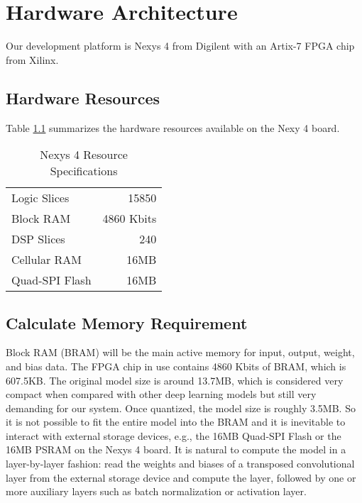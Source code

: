 
\chapter{Hardware Architecture}

Our development platform is Nexys 4 from Digilent with an Artix-7 FPGA chip from Xilinx.

\section{Hardware Resources}

Table \ref{table:hardware_resources} summarizes the hardware resources available on the Nexy 4 board.

\begin{table}[h]
  \centering
  \caption{Nexys 4 Resource Specifications}
  \begin{tabular}{lr}
    Logic Slices & 15850 \\
    Block RAM & 4860 Kbits \\
    DSP Slices & 240 \\
    Cellular RAM & 16MB \\
    Quad-SPI Flash & 16MB
  \end{tabular}
  \label{table:hardware_resources}
\end{table}

\section{Calculate Memory Requirement}

Block RAM (BRAM) will be the main active memory for input, output, weight, and bias data. The FPGA chip in use
contains 4860 Kbits of BRAM, which is 607.5KB. The original model size is around 13.7MB, which is
considered very compact when compared with other deep learning models but still very demanding for
our system. Once quantized, the model size is roughly 3.5MB. So it is not possible to fit the entire model
into the BRAM and it is inevitable to interact with external storage devices, e.g., the 16MB Quad-SPI Flash
or the 16MB PSRAM on the Nexys 4 board. It is natural to compute the model in a layer-by-layer fashion: read
the weights and biases of a transposed convolutional layer from the external storage device and compute the
layer, followed by one or more auxiliary layers such as batch normalization or activation layer.

\clearpage %
